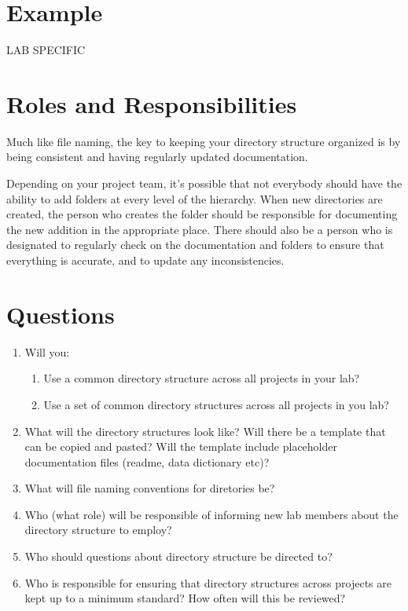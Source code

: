 \documentclass[
]{book}
\providecommand{\tightlist}{%
  \setlength{\itemsep}{0pt}\setlength{\parskip}{0pt}}
\begin{document}
\hypertarget{example}{%
\section*{Example}\label{example}}

LAB SPECIFIC

\hypertarget{roles-and-responsibilities-1}{%
\section*{Roles and Responsibilities}\label{roles-and-responsibilities-1}}

Much like file naming, the key to keeping your directory structure organized is by being consistent and having regularly updated documentation.

Depending on your project team, it's possible that not everybody should have the ability to add folders at every level of the hierarchy. When new directories are created, the person who creates the folder should be responsible for documenting the new addition in the appropriate place. There should also be a person who is designated to regularly check on the documentation and folders to ensure that everything is accurate, and to update any inconsistencies.

\hypertarget{questions-2}{%
\section*{Questions}\label{questions-2}}

\begin{enumerate}
\def\labelenumi{\arabic{enumi}.}
\tightlist
\item
  Will you:

  \begin{enumerate}
  \def\labelenumii{\alph{enumii}.}
  \tightlist
  \item
    Use a common directory structure across all projects in your lab?
  \item
    Use a set of common directory structures across all projects in you lab?
  \end{enumerate}
\item
  What will the directory structures look like? Will there be a template that can be copied and pasted? Will the template include placeholder documentation files (readme, data dictionary etc)?
\item
  What will file naming conventions for diretories be?
\item
  Who (what role) will be responsible of informing new lab members about the directory structure to employ?
\item
  Who should questions about directory structure be directed to?
\item
  Who is responsible for ensuring that directory structures across projects are kept up to a minimum standard? How often will this be reviewed?
\end{enumerate}
\end{document}
